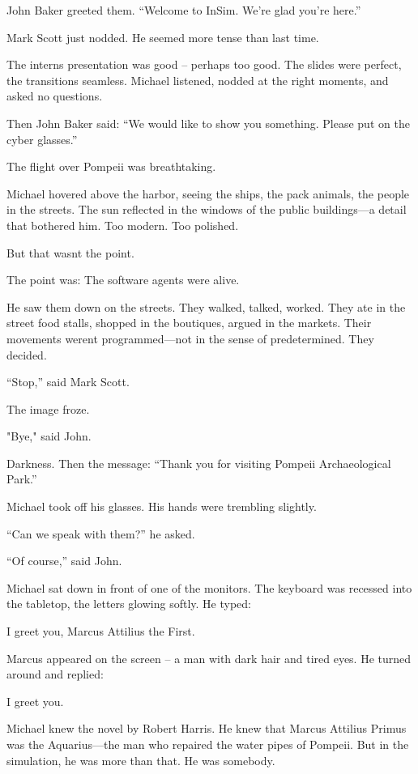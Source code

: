 \documentclass[
]{article}
\begin{document}
John Baker greeted them. ``Welcome to InSim. We're glad you're here.''

Mark Scott just nodded. He seemed more tense than last time.

The interns\textquotesingle{} presentation was good -- perhaps too good. The slides were perfect, the transitions seamless. Michael listened, nodded at the right moments, and asked no questions.

Then John Baker said: ``We would like to show you something. Please put on the cyber glasses.''

The flight over Pompeii was breathtaking.

Michael hovered above the harbor, seeing the ships, the pack animals, the people in the streets. The sun reflected in the windows of the public buildings---a detail that bothered him. Too modern. Too polished.

But that wasn\textquotesingle t the point.

The point was: The software agents were alive.

He saw them down on the streets. They walked, talked, worked. They ate in the street food stalls, shopped in the boutiques, argued in the markets. Their movements weren\textquotesingle t programmed---not in the sense of predetermined. They decided.

``Stop,'' said Mark Scott.

The image froze.

"Bye," said John.

Darkness. Then the message: ``Thank you for visiting Pompeii Archaeological Park.''

Michael took off his glasses. His hands were trembling slightly.

``Can we speak with them?'' he asked.

``Of course,'' said John.

Michael sat down in front of one of the monitors. The keyboard was recessed into the tabletop, the letters glowing softly. He typed:

I greet you, Marcus Attilius the First.

Marcus appeared on the screen -- a man with dark hair and tired eyes. He turned around and replied:

I greet you.

Michael knew the novel by Robert Harris. He knew that Marcus Attilius Primus was the Aquarius---the man who repaired the water pipes of Pompeii. But in the simulation, he was more than that. He was somebody.
\end{document}
